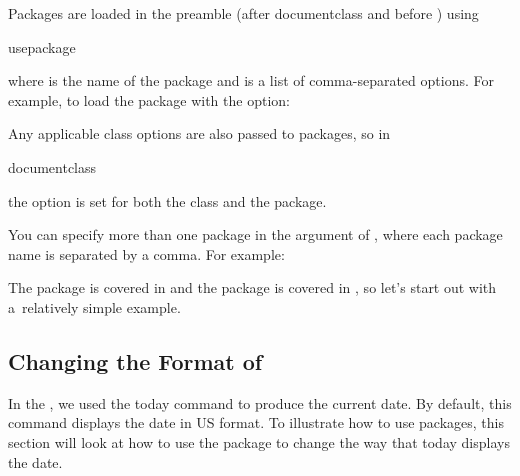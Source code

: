 Packages are loaded in the \gls{preamble} (after
\gls{documentclass} and before ) using
\begin{definition}
\gls{usepackage}
\end{definition}
where  is the name of the package and  is a list of comma-separated options. For example, to load the
package  with the  option:
\begin{codeS}
\end{codeS}
Any applicable class options are also passed to packages, so in
\begin{code}
\gls{documentclass}\newline
{}
\end{code}
the  option is set for both the  class
and the  package.

You can specify more than one package in the argument of
, where each package name is separated by a
comma. For example:
\begin{codeS}
\end{codeS}
The  package is covered in 
and the  package is covered in ,
so let's start out with a~relatively simple example.

\subsection{Changing the Format of
}
\label{sec:today}

In the , we used the
\gls{today} command to produce the current date. By default, this
command displays the date in US format. To illustrate how to use
packages, this section will look at how to use the 
package to change the way that \gls{today} displays the date.

